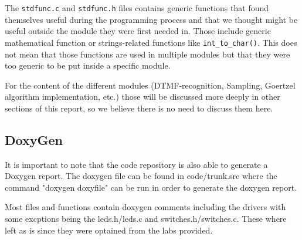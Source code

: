 \documentclass{cce2014-design}
\begin{document}
The \texttt{stdfunc.c} and \texttt{stdfunc.h} files contains generic functions
that found themselves useful during the programming process and that we thought
might be useful outside the module they were first needed in. Those include
generic mathematical function or strings-related functions like
\texttt{int\_to\_char()}. This does not mean that those functions are used in
multiple modules but that they were too generic to be put inside a specific
module.

For the content of the different modules (DTMF-recognition, Sampling, Goertzel
algorithm implementation, etc.) those will be discussed more deeply in other
sections of this report, so we believe there is no need to discuss them here. 

\subsection{DoxyGen}
It is important to note that the code repository is also able to generate a 
Doxygen report. The doxygen file can be found in code/trunk.src where the command 
"doxygen doxyfile" can be run in order to generate the doxygen report. 

Most files and functions contain doxygen comments including the drivers with some
excptions being the leds.h/leds.c and switches.h/switches.c. These where left as is
since they were optained from the labs provided.
\end{document}
